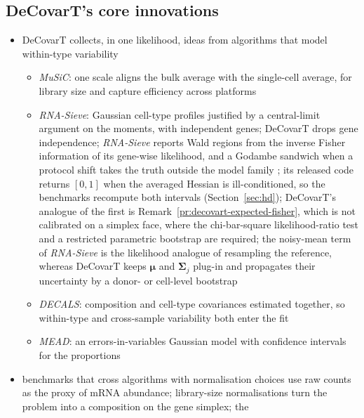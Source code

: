 \documentclass[pdflatex, sn-nature]{sn-jnl}
\theoremstyle{thmstyleone}%
\theoremstyle{thmstyletwo}%
\theoremstyle{thmstylethree}%
\begin{document}
\subsection{DeCovarT's core innovations}
\label{sec:limitations}

\begin{itemize}
  \item DeCovarT collects, in one likelihood, ideas from algorithms that model within-type variability
  \begin{itemize}
    \item \emph{MuSiC}: one scale aligns the bulk average with the single-cell average, for library size and
          capture efficiency across platforms \cite{wangBulkTissueCell2019}
    \item \emph{RNA-Sieve}: Gaussian cell-type profiles justified by a central-limit argument on the moments,
          with independent genes; DeCovarT drops gene independence; \emph{RNA-Sieve} reports Wald regions from the
          inverse Fisher information of its gene-wise likelihood, and a Godambe sandwich when a protocol shift takes
          the truth outside the model family \cite{erdmann-phamLikelihoodbasedDeconvolutionBulk2021}; its released code
          returns \([0,1]\) when the averaged Hessian is ill-conditioned, so the benchmarks recompute both intervals
          (Section~\ref{sec:hd});
          DeCovarT's analogue of the first is Remark~\ref{pr:decovart-expected-fisher}, which is not calibrated on a
          simplex face, where the chi-bar-square likelihood-ratio test and a restricted parametric bootstrap are
          required; the noisy-mean term of \emph{RNA-Sieve} is the likelihood analogue of resampling the reference,
          whereas DeCovarT keeps \(\boldsymbol{\mu}\) and \(\boldsymbol{\Sigma}_{j}\) plug-in and propagates their uncertainty by a donor- or
          cell-level bootstrap
    \item \emph{DECALS}: composition and cell-type covariances estimated together, so within-type and
          cross-sample variability both enter the fit \cite{caiStatisticalInferenceCelltype2024}
    \item \emph{MEAD}: an errors-in-variables Gaussian model with confidence intervals for the proportions
          \cite{xieStatisticalInferenceCell2026}
  \end{itemize}
  \item benchmarks that cross algorithms with normalisation choices use raw counts as the proxy of mRNA
        abundance; library-size normalisations turn the problem into a composition on the gene simplex; the

\end{itemize}
\end{document}

